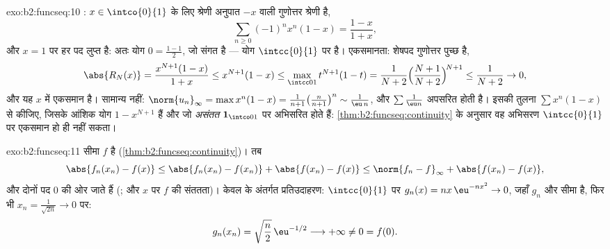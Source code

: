 \begin{solution}{exo:b2:funcseq:10}
: $x \in \intco{0}{1}$ के लिए श्रेणी अनुपात $-x$ वाली गुणोत्तर श्रेणी है,
\[
\sum_{n\geq0}(-1)^n x^n(1-x) = \frac{1-x}{1+x},
\]
और $x = 1$ पर हर पद लुप्त है: अतः योग $0 = \frac{1-1}{2}$, जो संगत है --- योग $\intcc{0}{1}$ पर  है।
एकसमानता: शेषपद गुणोत्तर पुच्छ है,
\[
\abs{R_N(x)} = \frac{x^{N+1}(1-x)}{1+x} \leq x^{N+1}(1 - x)
\leq \max_{\intcc01} t^{N+1}(1-t)
= \frac{1}{N+2}\Bigl(\frac{N+1}{N+2}\Bigr)^{\!N+1}
\leq \frac{1}{N+2} \to 0 ,
\]
और यह $x$ में एकसमान है। सामान्य नहीं: $\norm{u_n}_\infty =
\max x^n(1-x) = \frac{1}{n+1}\bigl(\frac{n}{n+1}\bigr)^n \sim
\frac{1}{\eu\,n}$, और $\sum \frac1{\eu n}$ अपसरित होती है। इसकी
तुलना $\sum x^n(1-x)$ से कीजिए, जिसके आंशिक योग $1 - x^{N+1}$ हैं और जो 
\emph{असंतत} $\mathbf 1_{\intco01}$ पर अभिसरित होते हैं: \cref{thm:b2:funcseq:continuity} के अनुसार वह अभिसरण $\intcc{0}{1}$ पर
एकसमान हो ही नहीं सकता।
\end{solution}

\begin{solution}{exo:b2:funcseq:11}
सीमा $f$  है (\cref{thm:b2:funcseq:continuity})। तब
\[
\abs{f_n(x_n) - f(x)}
\leq \abs{f_n(x_n) - f(x_n)} + \abs{f(x_n) - f(x)}
\leq \norm{f_n - f}_\infty + \abs{f(x_n) - f(x)} ,
\]
और दोनों पद $0$ की ओर जाते हैं (; और $x$ पर $f$ की संततता)।
केवल  के अंतर्गत प्रतिउदाहरण: $\intcc{0}{1}$ पर  $g_n(x) = nx\,\eu^{-nx^2} \to 0$, जहाँ
$g_n$ और सीमा  है, फिर भी $x_n =
\frac{1}{\sqrt{2n}} \to 0$ पर:
\[
g_n(x_n) = \sqrt{\frac n2}\,\eu^{-1/2} \longrightarrow +\infty
\neq 0 = f(0) .
\]
\end{solution}

